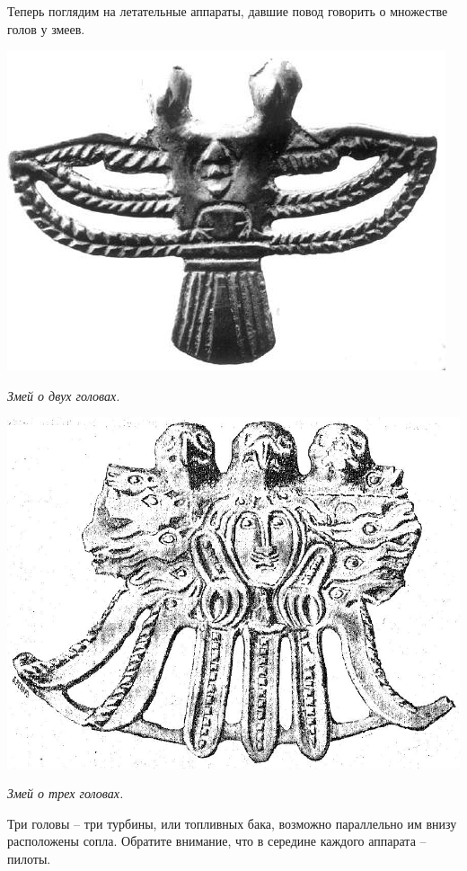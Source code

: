 Теперь поглядим на летательные аппараты, давшие повод говорить о множестве голов у змеев.

\begin{center}
\includegraphics[width=0.70\linewidth]{chast-zmiy/ktotakiezmei/ural-bogi-21.jpg}

\textit{Змей о двух головах.}
\end{center}

\begin{center}
\includegraphics[width=0.70\linewidth]{chast-zmiy/ktotakiezmei/ural-bogi-11.jpg}

\textit{Змей о трех головах.}
\end{center}

Три головы – три турбины, или топливных бака, возможно параллельно им внизу расположены сопла. Обратите внимание, что в середине каждого аппарата – пилоты.


